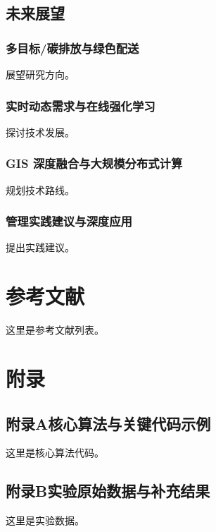 \documentclass[12pt,a4paper,twoside]{ctexbook}
\begin{document}
\section{未来展望}
\subsection{多目标/碳排放与绿色配送}
展望研究方向。

\subsection{实时动态需求与在线强化学习}
探讨技术发展。

\subsection{GIS 深度融合与大规模分布式计算}
规划技术路线。

\subsection{管理实践建议与深度应用}
提出实践建议。

\backmatter

\chapter*{参考文献}
这里是参考文献列表。

\chapter*{附录}

\section*{附录A\quad 核心算法与关键代码示例}
这里是核心算法代码。

\section*{附录B\quad 实验原始数据与补充结果}
这里是实验数据。
\end{document}
